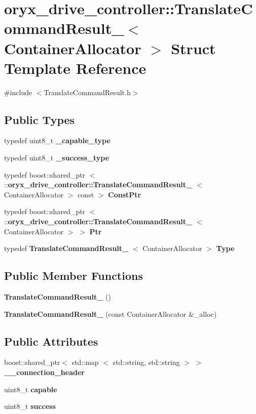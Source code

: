 \section{oryx\-\_\-drive\-\_\-controller\-:\-:\-Translate\-Command\-Result\-\_\-$<$ \-Container\-Allocator $>$ \-Struct \-Template \-Reference}
\label{structoryx__drive__controller_1_1TranslateCommandResult__}


{\ttfamily \#include $<$\-Translate\-Command\-Result.\-h$>$}

\subsection*{\-Public \-Types}
\begin{DoxyCompactItemize}
\item 
typedef uint8\-\_\-t {\bf \-\_\-capable\-\_\-type}
\item 
typedef uint8\-\_\-t {\bf \-\_\-success\-\_\-type}
\item 
typedef boost\-::shared\-\_\-ptr\*
$<$ \-::{\bf oryx\-\_\-drive\-\_\-controller\-::\-Translate\-Command\-Result\-\_\-}\*
$<$ \-Container\-Allocator $>$ const  $>$ {\bf \-Const\-Ptr}
\item 
typedef boost\-::shared\-\_\-ptr\*
$<$ \-::{\bf oryx\-\_\-drive\-\_\-controller\-::\-Translate\-Command\-Result\-\_\-}\*
$<$ \-Container\-Allocator $>$ $>$ {\bf \-Ptr}
\item 
typedef \*
{\bf \-Translate\-Command\-Result\-\_\-}\*
$<$ \-Container\-Allocator $>$ {\bf \-Type}
\end{DoxyCompactItemize}
\subsection*{\-Public \-Member \-Functions}
\begin{DoxyCompactItemize}
\item 
{\bf \-Translate\-Command\-Result\-\_\-} ()
\item 
{\bf \-Translate\-Command\-Result\-\_\-} (const \-Container\-Allocator \&\-\_\-alloc)
\end{DoxyCompactItemize}
\subsection*{\-Public \-Attributes}
\begin{DoxyCompactItemize}
\item 
boost\-::shared\-\_\-ptr$<$ std\-::map\*
$<$ std\-::string, std\-::string $>$ $>$ {\bf \-\_\-\-\_\-connection\-\_\-header}
\item 
uint8\-\_\-t {\bf capable}
\item 
uint8\-\_\-t {\bf success}
\end{DoxyCompactItemize}


